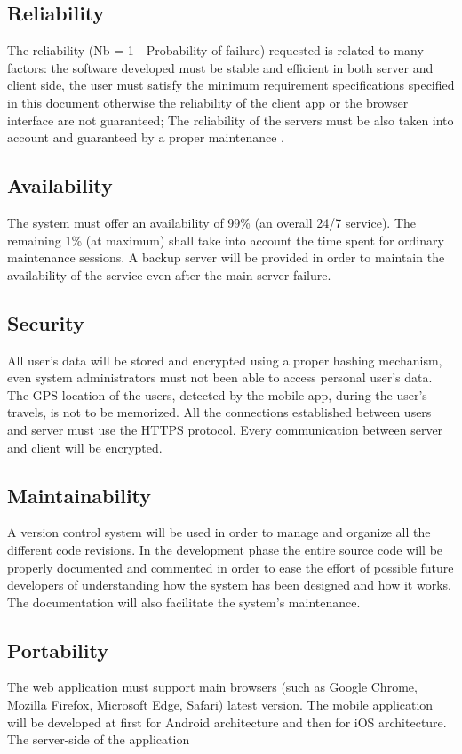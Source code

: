 \subsection{Reliability}
\label{subsect:Reliability}
	The reliability (Nb = 1 - Probability of failure) requested is related to many factors: the software developed must be stable and efficient in both server and client side, the user must satisfy the minimum requirement specifications specified in this document otherwise the reliability of the client app or the browser interface are not guaranteed; The reliability of the servers must be also taken into account and guaranteed by a proper maintenance .

\subsection{Availability}
\label{subsect:Availability}
	The system must offer an availability of 99\% (an overall 24/7 service). The remaining 1\% (at maximum) shall take into account the time spent for ordinary maintenance sessions. A backup server will be provided in order to maintain the availability of the service even after the main server failure.
\subsection{Security}
\label{subsect:Security}
	All user's data will be stored and encrypted using a proper hashing mechanism, even system administrators must not been able to access personal user's data. The GPS location of the users, detected by the mobile app, during the user's travels, is not to be memorized. All the connections established between users and server must use the
HTTPS protocol. Every communication between server and client will be encrypted.
\subsection{Maintainability}
\label{subsect:Maintainability}
	A version control system will be used in order to manage and organize all the different code revisions. In the development phase the entire source code will be properly documented and commented in order to ease the effort of possible future developers of understanding how the system has been designed and how it works. The documentation will also facilitate the system's maintenance. 
\subsection{Portability}
\label{subsect:Portability}
	The web application must support main browsers (such as Google Chrome, Mozilla Firefox, Microsoft Edge, Safari) latest version.\newline 
	The mobile application will be developed at first for Android architecture and then for iOS architecture.
	The server-side of the application 